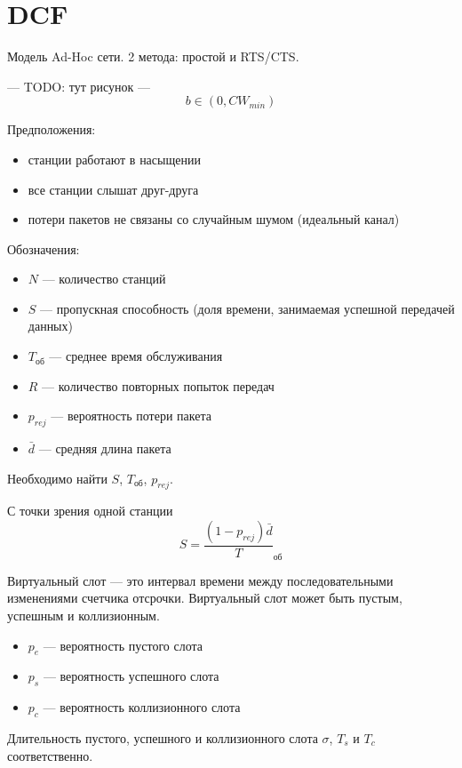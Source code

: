 \newcommand{\Tob}{T_\text{об}}
\newcommand{\prej}{p_{rej}}
\newcommand{\SIFS}{\text{SIFS}}
\newcommand{\EIFS}{\text{EIFS}}
\newcommand{\ACK}{\text{ACK}}
\newcommand{\DIFS}{\text{DIFS}}
\newcommand{\CTS}{\text{CTS}}
\newcommand{\RTS}{\text{RTS}}

\section{DCF}
Модель Ad-Hoc сети.  2 метода: простой и RTS/CTS.

--- TODO: тут рисунок ---
\[ b \in (0, CW_{min}) \]

Предположения:
\begin{itemize}
\item станции работают в насыщении
\item все станции слышат друг-друга
\item потери пакетов не связаны со случайным шумом (идеальный канал)
\end{itemize}

Обозначения:
\begin{itemize}
\item $N$ --- количество станций
\item $S$ --- пропускная способность (доля времени, занимаемая успешной передачей данных)
\item $\Tob$ --- среднее время обслуживания
\item $R$ --- количество повторных попыток передач
\item $\prej$ --- вероятность потери пакета
\item $\bar{d}$ --- средняя длина пакета
\end{itemize}

Необходимо найти $S$, $\Tob$, $\prej$.

С точки зрения одной станции
\[
S = \frac{(1 - \prej) \bar{d}}\Tob
\]

Виртуальный слот --- это интервал времени между последовательными изменениями счетчика отсрочки.  Виртуальный слот может быть пустым, успешным и коллизионным.

\begin{itemize}
\item $p_e$ --- вероятность пустого слота
\item $p_s$ --- вероятность успешного слота
\item $p_c$ --- вероятность коллизионного слота
\end{itemize}

Длительность пустого, успешного и коллизионного слота $\sigma$, $T_s$ и $T_c$ соответственно.


